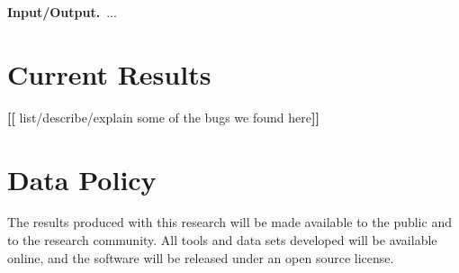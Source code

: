 \documentclass[11pt]{article}
\newcommand{\Fix}[1]{\textbf{[[}{\color{red} #1}\textbf{]]}}
\begin{document}
\vspace{1ex}\noindent\textbf{Input/Output.}~...

\section{Current Results}
\label{sec:results}

\Fix{list/describe/explain some of the bugs we found here}

\section{Data Policy}

The results produced with this research will be made available to the
public and to the research community.  All tools and data sets
developed will be available online, and the software will be released
under an open source license.


\footnotesize


\end{document}
